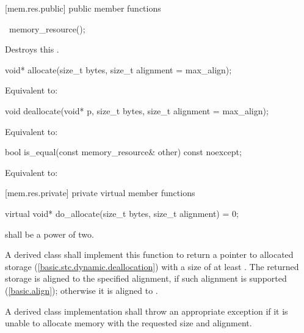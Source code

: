 [mem.res.public]{ public member functions}

%
\begin{itemdecl}
~memory_resource();
\end{itemdecl}

\begin{itemdescr}
\pnum
\effects
Destroys this .
\end{itemdescr}

%
\begin{itemdecl}
void* allocate(size_t bytes, size_t alignment = max_align);
\end{itemdecl}

\begin{itemdescr}
\pnum
\effects
Equivalent to: 
\end{itemdescr}

%
\begin{itemdecl}
void deallocate(void* p, size_t bytes, size_t alignment = max_align);
\end{itemdecl}

\begin{itemdescr}
\pnum
\effects
Equivalent to: 
\end{itemdescr}

%
\begin{itemdecl}
bool is_equal(const memory_resource& other) const noexcept;
\end{itemdecl}

\begin{itemdescr}
\pnum
\effects
Equivalent to: 
\end{itemdescr}


[mem.res.private]{ private virtual member functions}

%
\begin{itemdecl}
virtual void* do_allocate(size_t bytes, size_t alignment) = 0;
\end{itemdecl}

\begin{itemdescr}
\pnum
\requires
{} shall be a power of two.

\pnum
\returns
A derived class shall implement this function to return a pointer to allocated storage (\ref{basic.stc.dynamic.deallocation}) with a size of at least .
The returned storage is aligned to the specified alignment, if such alignment is supported (\ref{basic.align});
otherwise it is aligned to .

\pnum
\throws
A derived class implementation shall throw an appropriate exception if it is unable to allocate memory with the requested size and alignment.
\end{itemdescr}

